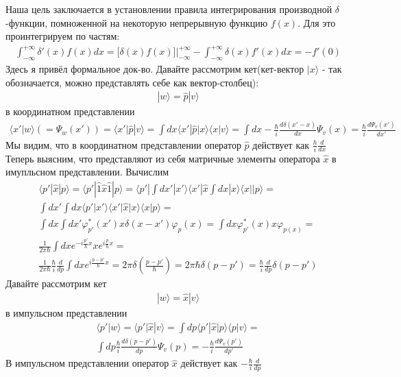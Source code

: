 \documentclass[__main__.tex]{subfiles}
\begin{document}
Наша цель заключается в установлении правила интегрирования производной $\delta$-функции, помноженной на некоторую непрерывную функцию $f(x)$. Для это проинтегрируем по частям:
\begin{gather*}
    \int_{-\infty}^{+\infty}{\delta'(x)f(x)dx} = \big[\delta(x)f(x)\big]\bigg|_{-\infty}^{+\infty} - \int_{-\infty}^{+\infty}{\delta(x)f'(x)dx} = -f'(0)
\end{gather*}
Здесь я привёл формальное док-во. Давайте рассмотрим кет(кет-вектор $|x\rangle$ - так обозначается, можно представлять себе как вектор-столбец):
\begin{gather*}
    |w\rangle = \widehat{p}|v\rangle
\end{gather*}
в координатном представлении
\begin{gather*}
    \langle x'|w\rangle (=\Psi_w(x')) = \langle x'|\widehat{p}|v\rangle = \int{dx}\langle x'|\widehat{p}|x\rangle\langle x|v\rangle = \int{dx} - \frac{\hbar}{i}\frac{d\delta(x' - x)}{dx}\Psi_v(x) = \frac{\hbar}{i}\frac{d\Psi_v(x')}{dx'}
\end{gather*}
Мы видим, что в координатном представлении оператор $\widehat{p}$ действует как $\frac{h}{i}\frac{d}{dx}$ \\
Теперь выясним, что представляют из себя матричные элементы оператора $\widehat{x}$ в имупльсном представлении. Вычислим
\begin{gather*}
    \langle p'|\widehat{x}|p\rangle = \langle p'|\widehat{1}\widehat{x}\widehat{1}|p\rangle = \langle p'|\int{dx'}|x'\rangle\langle x'|\widehat{x}\int{dx}|x\rangle\langle x||p\rangle = \\
    \int{dx'}\int{dx}\langle p'|x'\rangle\langle x'|\widehat{x}|x\rangle\langle x|p\rangle = \\
    \int{dx}\int{dx'}\varphi_{p'}^{*}(x')x\delta(x - x')\varphi_{p}(x) = \int{dx}\varphi_{p'}^{*}(x)x\varphi_{p(x)} =\\
    \frac{1}{2\pi\hbar}\int{dx}e^{-i\frac{p'}{\hbar}x}xe^{i\frac{p}{\hbar}x} =\\
    \frac{1}{2\pi\hbar}\frac{\hbar}{i}\frac{d}{dp}\int{dx}e^{i\frac{p - p'}{\hbar}x} = 2\pi\delta(\frac{p - p'}{\hbar}) = 2\pi\hbar\delta(p - p') = \frac{\hbar}{i}\frac{d}{dp}\delta(p - p')
\end{gather*}
Давайте рассмотрим кет
\begin{gather*}
    |w\rangle = \widehat{x}|v\rangle
\end{gather*}
в импульсном представлении
\begin{gather*}
    \langle p'|w\rangle = \langle p'|\widehat{x}|v\rangle = \int{dp}\langle p'|\widehat{x}|p\rangle\langle p|v\rangle =\\ \int{dp}\frac{\hbar}{i}\frac{d\delta(p - p')}{dp}\Psi_{v}(p) = -\frac{\hbar}{i}\frac{d\Psi_{v}(p')}{dp'}
\end{gather*}
В импульсном представлении оператор $\widehat{x}$ действует как $-\frac{\hbar}{i}\frac{d}{dp}$
\end{document}

